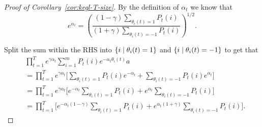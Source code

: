 \documentclass[12pt,a4paper,oneside,onecolumn]{book}
\begin{document}
\begin{proof}[Proof of Corollary~\ref{cor:kegl-T-size}]
  By the definition of $\alpha_t$ we know that
  \[
    e^{\alpha_t} = 
    \left(
      \frac{(1-\gamma)\sum_{\theta_i(t)=1}P_t(i)}
      {(1+\gamma)\sum_{\theta_i(t)=-1}P_t(i)}
    \right)^{1/2}.
  \]

  Split the sum within the RHS into
  $\left\{ i \mid \theta_i(t) = 1 \right\}$
  and
  $\left\{ i \mid \theta_i(t) = -1 \right\}$
  to get that
  \begin{align*}
    &\prod_{t=1}^T e^{\gamma \alpha_t} 
    \sum_{i=1}^m P_t(i) e^{-\alpha_t \theta_i(t)}a \\
    &= \prod_{t=1}^T e^{\gamma \alpha_t} 
    \Biggl[
    \sum_{\theta_i(t)=1} P_t(i) e^{-\alpha_t}
    +
    \sum_{\theta_i(t)=-1} P_t(i) e^{\alpha_t}
    \Biggl] \\
    &= \prod_{t=1}^T e^{\gamma \alpha_t} 
    \Biggl[
    e^{-\alpha_t} \sum_{\theta_i(t)=1} P_t(i) 
    +
    e^{\alpha_t} \sum_{\theta_i(t)=-1} P_t(i)
    \Biggl] \\
    &= \prod_{t=1}^T
    \Biggl[
    e^{-\alpha_t(1-\gamma)} \sum_{\theta_i(t)=1} P_t(i) 
    +
    e^{\alpha_t(1+\gamma)} \sum_{\theta_i(t)=-1} P_t(i)
    \Biggl].
  \end{align*}


\end{proof}
\end{document}
